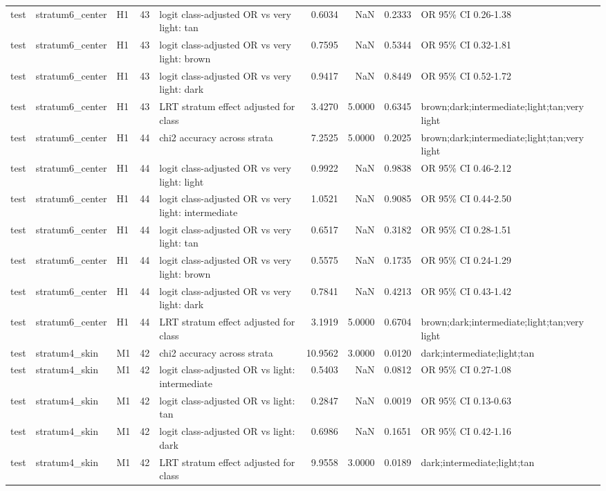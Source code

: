 \begin{tabular}{lllrlrrrl}
test & stratum6\_center & H1 & 43 & logit class-adjusted OR vs very light: tan & 0.6034 & NaN & 0.2333 & OR 95\% CI 0.26-1.38 \\
test & stratum6\_center & H1 & 43 & logit class-adjusted OR vs very light: brown & 0.7595 & NaN & 0.5344 & OR 95\% CI 0.32-1.81 \\
test & stratum6\_center & H1 & 43 & logit class-adjusted OR vs very light: dark & 0.9417 & NaN & 0.8449 & OR 95\% CI 0.52-1.72 \\
test & stratum6\_center & H1 & 43 & LRT stratum effect adjusted for class & 3.4270 & 5.0000 & 0.6345 & brown;dark;intermediate;light;tan;very light \\
test & stratum6\_center & H1 & 44 & chi2 accuracy across strata & 7.2525 & 5.0000 & 0.2025 & brown;dark;intermediate;light;tan;very light \\
test & stratum6\_center & H1 & 44 & logit class-adjusted OR vs very light: light & 0.9922 & NaN & 0.9838 & OR 95\% CI 0.46-2.12 \\
test & stratum6\_center & H1 & 44 & logit class-adjusted OR vs very light: intermediate & 1.0521 & NaN & 0.9085 & OR 95\% CI 0.44-2.50 \\
test & stratum6\_center & H1 & 44 & logit class-adjusted OR vs very light: tan & 0.6517 & NaN & 0.3182 & OR 95\% CI 0.28-1.51 \\
test & stratum6\_center & H1 & 44 & logit class-adjusted OR vs very light: brown & 0.5575 & NaN & 0.1735 & OR 95\% CI 0.24-1.29 \\
test & stratum6\_center & H1 & 44 & logit class-adjusted OR vs very light: dark & 0.7841 & NaN & 0.4213 & OR 95\% CI 0.43-1.42 \\
test & stratum6\_center & H1 & 44 & LRT stratum effect adjusted for class & 3.1919 & 5.0000 & 0.6704 & brown;dark;intermediate;light;tan;very light \\
test & stratum4\_skin & M1 & 42 & chi2 accuracy across strata & 10.9562 & 3.0000 & 0.0120 & dark;intermediate;light;tan \\
test & stratum4\_skin & M1 & 42 & logit class-adjusted OR vs light: intermediate & 0.5403 & NaN & 0.0812 & OR 95\% CI 0.27-1.08 \\
test & stratum4\_skin & M1 & 42 & logit class-adjusted OR vs light: tan & 0.2847 & NaN & 0.0019 & OR 95\% CI 0.13-0.63 \\
test & stratum4\_skin & M1 & 42 & logit class-adjusted OR vs light: dark & 0.6986 & NaN & 0.1651 & OR 95\% CI 0.42-1.16 \\
test & stratum4\_skin & M1 & 42 & LRT stratum effect adjusted for class & 9.9558 & 3.0000 & 0.0189 & dark;intermediate;light;tan \\

\end{tabular}
